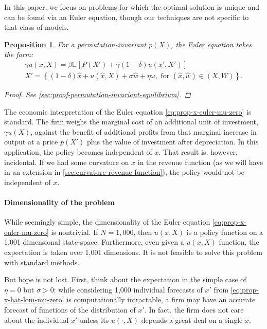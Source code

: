 \documentclass[12pt]{article}
\newtheorem{proposition}{Proposition}
\newcommand{\expec}[2][]{\ensuremath{\mathbb{E}_{{#1}}\left[ {#2} \right]}}
\begin{document}
In this paper, we focus on problems for which the optimal solution is unique and can be found via an Euler equation, though our techniques are not specific to that class of models. 	

\begin{proposition}\label{prop:invariant-euler}
For a permutation-invariant $p(X)$, the Euler equation takes the form:
\begin{gather}
\gamma u(x,X) = \beta \expec{P(X')+\gamma (1-\delta) u(x',X') }\label{eq:prop-x-euler-mu-zero}\\
X' = \left\{(1-\delta)\hat{x} + u(\hat{x},X) + \sigma \hat{w} + \eta \omega, \text{ for }  (\hat{x}, \hat{w}) \in (X,W)\right\}\label{eq:prop-x-hat-lom-mu-zero}.
\end{gather}
\begin{proof}
See \cref{sec:proof-permutation-invariant-equilibrium}.
\end{proof}
\end{proposition}

The economic interpretation of the Euler equation \cref{eq:prop-x-euler-mu-zero} is standard. The firm weighs the marginal cost of an additional unit of investment, $\gamma u(X)$, against the benefit of additional profits from that marginal increase in output at a price $p(X')$ plus the value of investment after depreciation. In this application, the policy becomes independent of $x$. That result is, however, incidental. If we had some curvature on $x$ in the revenue function (as we will have in an extension in \cref{sec:curvature-revenue-function}), the policy would not be independent of $x$.
	
\paragraph{Dimensionality of the problem} While seemingly simple, the dimensionality of the Euler equation \cref{eq:prop-x-euler-mu-zero} is nontrivial. If $N=1,000$, then $u(x,X)$ is a policy function on a 1,001 dimensional state-space. Furthermore, even given a $u(x,X)$ function, the expectation is taken over 1,001 dimensions. It is not feasible to solve this problem with standard methods.

But hope is not lost.  First, think about the expectation in the simple case of $\eta = 0$ but $\sigma > 0$: while considering 1,000 individual forecasts of $x'$ from \cref{eq:prop-x-hat-lom-mu-zero} is computationally intractable, a firm may have an accurate forecast of functions of the distribution of $x'$. In fact, the firm does not care about the individual $x'$ unless its $u(\cdot,X)$ depends a great deal on a single $\hat{x}$.
\end{document}
